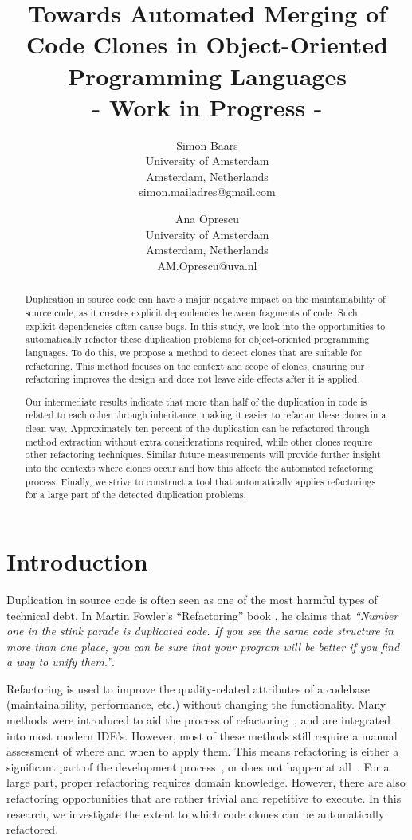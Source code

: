 \documentclass[a4paper]{article}
\title{Towards Automated Merging of Code Clones in Object-Oriented Programming Languages\\- Work in Progress -}
\author{
Simon Baars \\ University of Amsterdam\\
                Amsterdam, Netherlands \\ simon.mailadres@gmail.com
\and
Ana Oprescu \\ University of Amsterdam\\
                Amsterdam, Netherlands \\
                AM.Oprescu@uva.nl
}
\begin{document}
\maketitle

\begin{abstract}
Duplication in source code can have a major negative impact on the maintainability of source code, as it creates explicit dependencies between fragments of code. Such explicit dependencies often cause bugs. In this study, we look into the opportunities to automatically refactor these duplication problems for object-oriented programming languages. To do this, we propose a method to detect clones that are suitable for refactoring. This method focuses on the context and scope of clones, ensuring our refactoring improves the design and does not leave side effects after it is applied.

Our intermediate results indicate that more than half of the duplication in code is related to each other through inheritance, making it easier to refactor these clones in a clean way. Approximately ten percent of the duplication can be refactored through method extraction without extra considerations required, while other clones require other refactoring techniques. Similar future measurements will provide further insight into the contexts where clones occur and how this affects the automated refactoring process. Finally, we strive to construct a tool that automatically applies refactorings for a large part of the detected duplication problems.
\end{abstract}

\section{Introduction}
Duplication in source code is often seen as one of the most harmful types of technical debt. In Martin Fowler's ``Refactoring'' book \cite{fowler1999refactoring}, he claims that \textit{``Number one in the stink parade is duplicated code. If you see the same code structure in more than one place, you can be sure that your program will be better if you find a way to unify them.''}.

Refactoring is used to improve the quality-related attributes of a codebase (maintainability, performance, etc.) without changing the functionality. Many methods were introduced to aid the process of refactoring~\cite{fowler1999refactoring, wake2004refactoring}, and are integrated into most modern IDE's. However, most of these methods still require a manual assessment of where and when to apply them. This means refactoring is either a significant part of the development process~\cite{lientz1978characteristics, mens2004survey}, or does not happen at all~\cite{mens2003refactoring}. For a large part, proper refactoring requires domain knowledge. However, there are also refactoring opportunities that are rather trivial and repetitive to execute. In this research, we investigate the extent to which code clones can be automatically refactored.
\end{document}
